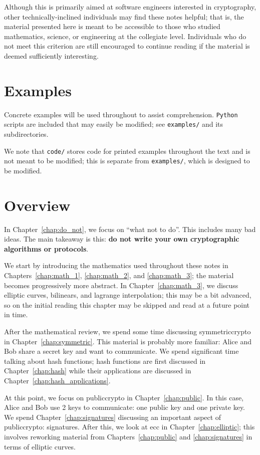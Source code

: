 Although this is primarily aimed at software engineers
interested in cryptography,
other technically-inclined individuals may find these notes helpful;
that is, the material presented here is meant to be accessible
to those who studied mathematics,
science, or engineering at the collegiate level.
Individuals who do not meet this criterion are still encouraged
to continue reading if the material is deemed sufficiently interesting.



\section{Examples}

Concrete examples will be used throughout to assist comprehension.
\texttt{Python} scripts are included that may easily be modified;
see \texttt{examples/} and its subdirectories.

We note that \texttt{code/} stores code for printed examples
throughout the text and is not meant to be modified;
this is separate from \texttt{examples/}, which is designed to be modified.


\section{Overview}

In Chapter~\ref{chap:do_not}, we focus on ``what not to do''.
This includes many bad ideas.
The main takeaway is this:
\textbf{do not write your own cryptographic algorithms or protocols}.

We start by introducing the mathematics used
throughout these notes in Chapters~\ref{chap:math_1},
\ref{chap:math_2}, and \ref{chap:math_3};
the material becomes progressively more abstract.
In Chapter~\ref{chap:math_3}, we discuss \glspl{elliptic curve},
\glspl{bilinear}, and \gls{lagrange interpolation};
this may be a bit advanced,
so on the initial reading this chapter may be skipped
and read at a future point in time.

After the mathematical review, we spend some time discussing
\gls{symmetriccrypto} in Chapter~\ref{chap:symmetric}.
This material is probably more familiar:
Alice and Bob share a secret key and want to communicate.
We spend significant time talking about \glspl{hash function};
\glspl{hash function} are first discussed in
Chapter~\ref{chap:hash} while their applications are discussed in
Chapter~\ref{chap:hash_applications}.

At this point, we focus on \gls{publiccrypto}
in Chapter~\ref{chap:public}.
In this case, Alice and Bob use 2 keys to communicate:
one public key and one private key.
We spend Chapter~\ref{chap:signatures} discussing an important
aspect of \gls{publiccrypto}: \glspl{signature}.
After this, we look at \gls{ecc} in Chapter~\ref{chap:elliptic};
this involves reworking material from Chapters~\ref{chap:public}
and \ref{chap:signatures} in terms of \glspl{elliptic curve}.

